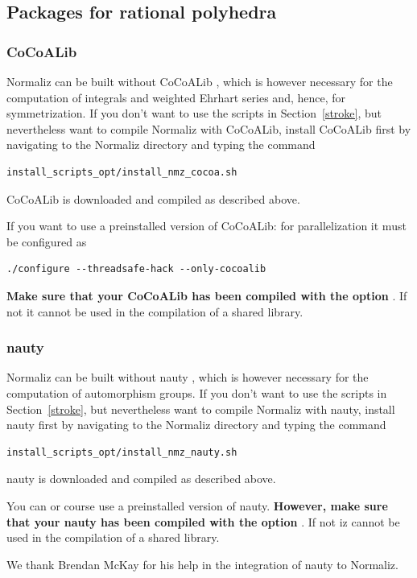 \subsection{Packages for rational polyhedra}

\subsubsection{CoCoALib}

Normaliz can be built without CoCoALib \cite{CoCoA}, which is however necessary for the computation of integrals and weighted Ehrhart series and, hence, for symmetrization. If you don't want to use the scripts in Section~\ref{stroke}, but nevertheless want to compile Normaliz with CoCoALib, install CoCoALib first by navigating to the Normaliz directory and typing the command
\begin{Verbatim}
install_scripts_opt/install_nmz_cocoa.sh
\end{Verbatim}
CoCoALib is downloaded and compiled as described above.

If you want to use a preinstalled version of CoCoALib: for parallelization it must be configured as
\begin{Verbatim}
./configure --threadsafe-hack --only-cocoalib
\end{Verbatim}
\textbf{Make sure that your CoCoALib has been compiled with the option }. If not it cannot be used in the compilation of a shared library.

\subsubsection{nauty}

Normaliz can be built without nauty \cite{nauty}, which is however necessary for the computation of automorphism groups. If you don't want to use the scripts in Section~\ref{stroke}, but nevertheless want to compile Normaliz with nauty, install nauty first by navigating to the Normaliz directory and typing the command
\begin{Verbatim}
install_scripts_opt/install_nmz_nauty.sh
\end{Verbatim}
nauty is downloaded and compiled as described above.

You can or course use a preinstalled version of nauty. \textbf{However, make sure that your nauty has been compiled with the option }. If not iz cannot be used in the compilation of a shared library.

We thank Brendan McKay for his help in the integration of nauty to Normaliz.

